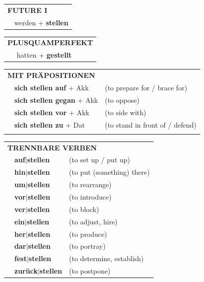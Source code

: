 \documentclass[10pt,a4paper]{revtex4-2}
\begin{document}
\begin{verbbox-acc}
\begin{tabular}{rl}
    \multicolumn{2}{l}{\textbf{FUTURE I} }\\
   & werden + \textbf{stellen}\\
 
  \end{tabular}
\hfill
   \begin{tabular}{rl}
      \multicolumn{2}{l}{\textbf{PLUSQUAMPERFEKT}}\\
   & hatten + \textbf{gestellt}\\
  \end{tabular}
  
\vspace{10pt}

   \begin{tabular}{lll}
      \multicolumn{3}{l}{\textbf{MIT PRÄPOSITIONEN}}\\
&\textbf{sich stellen auf} + Akk & (to prepare for / brace for)\\
& \textbf{sich stellen gegan} + Akk & (to oppose)\\
& \textbf{sich stellen vor} + Akk & (to side with)\\
&\textbf{sich stellen zu} + Dat & (to stand in front of / defend)\\
\vspace{60pt}
  \end{tabular}
  \hfill
   \begin{tabular}{lll}
      \multicolumn{3}{l}{\textbf{TRENNBARE VERBEN}}\\
 & \textbf{auf$|$stellen} & (to set up / put up)\\
&\textbf{hin$|$stellen} & (to put (something) there)\\
&\textbf{um$|$stellen} & (to rearrange)\\
&\textbf{vor$|$stellen} & (to introduce)\\
&\textbf{ver$|$stellen} & (to block)\\
&\textbf{ein$|$stellen} & (to adjust, hire)\\
&\textbf{her$|$stellen} & (to produce)\\
&\textbf{dar$|$stellen} & (to portray)\\
&\textbf{fest$|$stellen} & (to determine, establish)\\
&\textbf{zurück$|$stellen} & (to postpone)
  \end{tabular}


  \vspace{-5pt}


\end{verbbox-acc}
\end{document}
